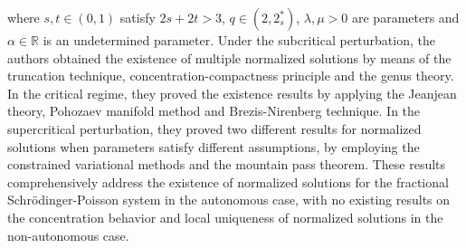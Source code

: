 \documentclass[reqno, 11pt]{amsart} %
\numberwithin{equation}{section}
\begin{document}
	where $s, t\in (0, 1)$ satisfy $2s+2t>3$, $q\in (2, 2_{s}^{\ast})$, $\lambda, \mu>0$ are parameters and $\alpha\in \mathbb{R}$ is an undetermined parameter. Under the subcritical perturbation,  the authors obtained the existence of multiple normalized solutions by means of the truncation technique, concentration-compactness principle and the genus theory. In the critical regime, they proved the existence results by applying the Jeanjean theory, Pohozaev manifold method and Brezis-Nirenberg technique. In the supercritical perturbation, they proved two different results for normalized solutions when parameters satisfy different assumptions, by employing the constrained variational methods and the mountain pass theorem.
	These results comprehensively address the existence of normalized solutions for the fractional Schr\"{o}dinger-Poisson system in the autonomous case, with no existing results on the concentration behavior and local uniqueness of normalized solutions in the non-autonomous case. 
	
\end{document}
